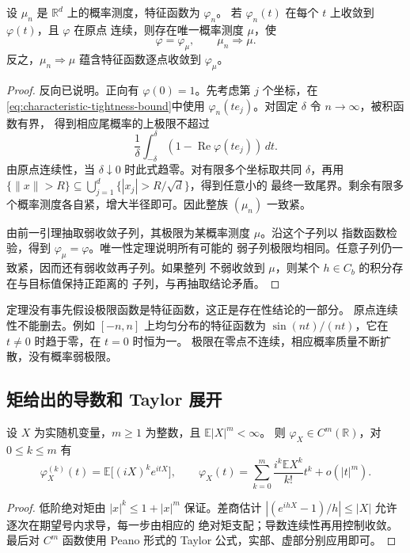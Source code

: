 \begin{theorem}
\label{thm:levy-continuity}
设 $\mu_n$ 是 $\mathbb R^d$ 上的概率测度，特征函数为 $\varphi_n$。
若 $\varphi_n(t)$ 在每个 $t$ 上收敛到 $\varphi(t)$，且 $\varphi$ 在原点
连续，则存在唯一概率测度 $\mu$，使
\[
 \varphi=\varphi_\mu,\qquad \mu_n\Rightarrow\mu.
\]
反之，$\mu_n\Rightarrow\mu$ 蕴含特征函数逐点收敛到 $\varphi_\mu$。
\end{theorem}

\begin{proof}
反向已说明。正向有 $\varphi(0)=1$。先考虑第 $j$ 个坐标，在
\eqref{eq:characteristic-tightness-bound}中使用
$\varphi_n(te_j)$。对固定 $\delta$ 令 $n\to\infty$，被积函数有界，
得到相应尾概率的上极限不超过
\[
 \frac1\delta\int_{-\delta}^{\delta}
               (1-\operatorname{Re}\varphi(te_j))\,dt.
\]
由原点连续性，当 $\delta\downarrow0$ 时此式趋零。对有限多个坐标取共同
$\delta$，再用
$\{\|x\|>R\}\subseteq\bigcup_{j=1}^d\{|x_j|>R/\sqrt d\}$，得到任意小的
最终一致尾界。剩余有限多个概率测度各自紧，增大半径即可。因此整族
$(\mu_n)$ 一致紧。

由前一引理抽取弱收敛子列，其极限为某概率测度 $\mu$。沿这个子列以
指数函数检验，得到 $\varphi_\mu=\varphi$。唯一性定理说明所有可能的
弱子列极限均相同。任意子列仍一致紧，因而还有弱收敛再子列。如果整列
不弱收敛到 $\mu$，则某个 $h\in C_b$ 的积分存在与目标值保持正距离的
子列，与再抽取结论矛盾。
\end{proof}

定理没有事先假设极限函数是特征函数，这正是存在性结论的一部分。
原点连续性不能删去。例如 $[-n,n]$ 上均匀分布的特征函数为
$\sin(nt)/(nt)$，它在 $t\ne0$ 时趋于零，在 $t=0$ 时恒为一。
极限在零点不连续，相应概率质量不断扩散，没有概率弱极限。

\subsection{矩给出的导数和 Taylor 展开}

\begin{proposition}
\label{prop:characteristic-moments-taylor}
设 $X$ 为实随机变量，$m\ge1$ 为整数，且 $\mathbb E|X|^m<\infty$。
则 $\varphi_X\in C^m(\mathbb R)$，对 $0\le k\le m$ 有
\[
 \varphi_X^{(k)}(t)=\mathbb E\bigl[(iX)^ke^{itX}\bigr],\qquad
 \varphi_X(t)=\sum_{k=0}^m\frac{i^k\mathbb E X^k}{k!}t^k+o(|t|^m).
\]
\end{proposition}

\begin{proof}
低阶绝对矩由 $|x|^k\le1+|x|^m$ 保证。差商估计
$|(e^{ihX}-1)/h|\le|X|$ 允许逐次在期望号内求导，每一步由相应的
绝对矩支配；导数连续性再用控制收敛。最后对 $C^m$ 函数使用 Peano
形式的 Taylor 公式，实部、虚部分别应用即可。
\end{proof}

